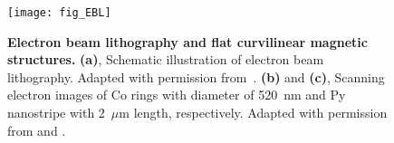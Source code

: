 %
%

\begin{figure}[t]
	\centering
	\texttt{[image: fig\_EBL]}
	\caption{\label{fig:EBL_schematics}%
		\textbf{Electron beam lithography and flat curvilinear magnetic structures.} \textbf{(a)}, Schematic illustration of electron beam lithography. Adapted with permission from~\cite{Pimpin12}. \textbf{(b)} and  \textbf{(c)}, Scanning electron images of Co rings with diameter of 520~nm and Py nanostripe with 2~$\mu$m length, respectively. Adapted with permission from \cite{Castano03} and \cite{Volkov19c}.  
	}
\end{figure}


